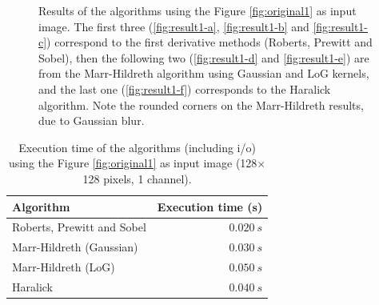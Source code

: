 \documentclass{ipol}
\numberwithin{equation}{section}
\numberwithin{table}{section}
\numberwithin{figure}{section}
\begin{document}
\begin{figure}[h!]
	\quad
	\quad
	\caption{Results of the algorithms using the Figure \ref{fig:original1} as input image. The first three (\ref{fig:result1-a}, \ref{fig:result1-b} and \ref{fig:result1-c}) correspond to the first derivative methods (Roberts, Prewitt and Sobel), then the following two (\ref{fig:result1-d} and \ref{fig:result1-e}) are from the Marr-Hildreth algorithm using Gaussian and LoG kernels, and the last one (\ref{fig:result1-f}) corresponds to the Haralick algorithm. Note the rounded corners on the Marr-Hildreth results, due to Gaussian blur.}
	\label{fig:result1}
\end{figure}

\begin{table}[t!]
	\begin{center}
	\begin{tabular}{| l | r |}
		\hline \rule{0pt}{3ex}
		\cellcolor[gray]{0.8} \textbf{Algorithm}	& \cellcolor[gray]{0.8} \textbf{Execution time (s)}	\\ \hline \rule{0pt}{3ex}
		Roberts, Prewitt and Sobel					& $0.020 \ s$										\\ \hline \rule{0pt}{3ex}
		Marr-Hildreth (Gaussian)					& $0.030 \ s$										\\ \hline \rule{0pt}{3ex}
		Marr-Hildreth (LoG)							& $0.050 \ s$										\\ \hline \rule{0pt}{3ex}
		Haralick									& $0.040 \ s$										\\
		\hline
	\end{tabular}
	\end{center}
	\caption{Execution time of the algorithms (including i/o) using the Figure \ref{fig:original1} as input image (128$\times$128 pixels, 1 channel).}
	\label{exectime1}
\end{table}
\vspace{0.5cm}
\end{document}
